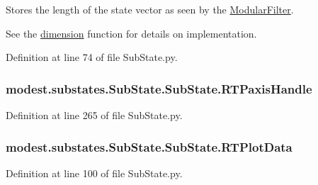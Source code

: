 Stores the length of the state vector as seen by the \hyperlink{namespacemodest_1_1ModularFilter}{Modular\+Filter}. 

See the \hyperlink{classmodest_1_1substates_1_1SubState_1_1SubState_aaf7473d2ebcd61adf1b7bb2262eb31d1}{dimension} function for details on implementation. 

Definition at line 74 of file Sub\+State.\+py.

\subsubsection[{\texorpdfstring{R\+T\+Paxis\+Handle}{RTPaxisHandle}}]{\setlength{\rightskip}{0pt plus 5cm}modest.\+substates.\+Sub\+State.\+Sub\+State.\+R\+T\+Paxis\+Handle}\hypertarget{classmodest_1_1substates_1_1SubState_1_1SubState_a914ef37afe2f8ab5c2ee9a6f4d898553}{}\label{classmodest_1_1substates_1_1SubState_1_1SubState_a914ef37afe2f8ab5c2ee9a6f4d898553}


Definition at line 265 of file Sub\+State.\+py.

\subsubsection[{\texorpdfstring{R\+T\+Plot\+Data}{RTPlotData}}]{\setlength{\rightskip}{0pt plus 5cm}modest.\+substates.\+Sub\+State.\+Sub\+State.\+R\+T\+Plot\+Data}\hypertarget{classmodest_1_1substates_1_1SubState_1_1SubState_a7f639244937fbae85f58ac478b0528c0}{}\label{classmodest_1_1substates_1_1SubState_1_1SubState_a7f639244937fbae85f58ac478b0528c0}


Definition at line 100 of file Sub\+State.\+py.

